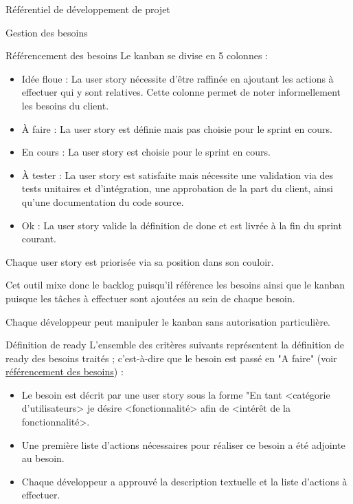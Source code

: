 \documentclass[]{article}
\begin{document}
{\begin{section}{\label{sec:Référentiel de développement de projet}Référentiel de développement de projet}
\begin{subsection}{\label{sec:Gestion des besoins}Gestion des besoins}
\begin{subsubsection}{\label{sec:Référencement des besoins}Référencement des besoins}
             Le kanban se divise en 5 colonnes :
             \begin{itemize}
                 \item Idée floue : La user story nécessite d'être raffinée en ajoutant les actions à effectuer qui y sont relatives. Cette colonne permet de noter informellement les besoins du client.
                 \item À faire : La user story est définie mais pas choisie pour le sprint en cours.
                 \item En cours : La user story est choisie pour le sprint en cours.
                 \item À tester : La user story est satisfaite mais nécessite une validation via des tests unitaires et d’intégration, une approbation de la part du client, ainsi qu’une documentation du code source.
                 \item Ok : La user story valide la définition de done et est livrée à la fin du sprint courant.
             \end{itemize}

             Chaque user story est priorisée via sa position dans son couloir.

             Cet outil mixe donc le backlog puisqu’il référence les besoins ainsi que le kanban puisque les tâches à effectuer sont ajoutées au sein de chaque besoin.

             Chaque développeur peut manipuler le kanban sans autorisation particulière.
         \end{subsubsection}

         \begin{subsubsection}{\label{sec:Définition de ready}Définition de ready}
            L'ensemble des critères suivants représentent la définition de ready des besoins traités ; c'est-à-dire que le besoin est passé en "A faire" (voir \hyperref[sec:Référencement des besoins]{référencement des besoins}) : 
            \begin{itemize}
                \item Le besoin est décrit par une user story sous la forme "En tant <catégorie d'utilisateurs> je désire <fonctionnalité> afin de <intérêt de la fonctionnalité>.
                \item Une première liste d'actions nécessaires pour réaliser ce besoin a été adjointe au besoin.
                \item Chaque développeur a approuvé la description textuelle et la liste d'actions à effectuer.
            \end{itemize}
        \end{subsubsection}


\end{subsection}
\end{section}}
\end{document}
